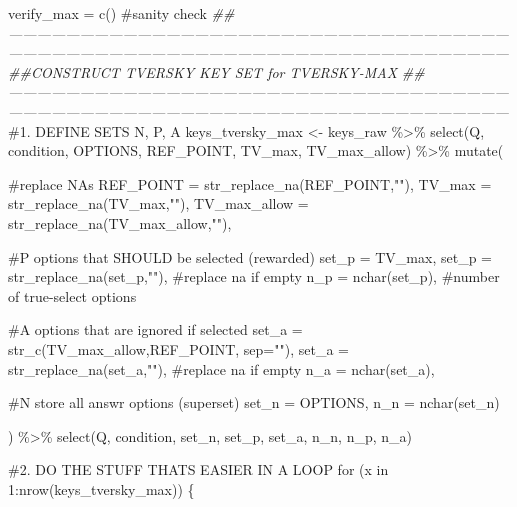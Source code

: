 \documentclass[
  letterpaper,
  DIV=11,
  numbers=noendperiod]{scrreprt}
\newenvironment{Shaded}{\begin{snugshade}}{\end{snugshade}}
\newcommand{\AttributeTok}[1]{\textcolor[rgb]{0.40,0.45,0.13}{#1}}
\newcommand{\CommentTok}[1]{\textcolor[rgb]{0.37,0.37,0.37}{#1}}
\newcommand{\ControlFlowTok}[1]{\textcolor[rgb]{0.00,0.23,0.31}{#1}}
\newcommand{\DecValTok}[1]{\textcolor[rgb]{0.68,0.00,0.00}{#1}}
\newcommand{\DocumentationTok}[1]{\textcolor[rgb]{0.37,0.37,0.37}{\textit{#1}}}
\newcommand{\FunctionTok}[1]{\textcolor[rgb]{0.28,0.35,0.67}{#1}}
\newcommand{\NormalTok}[1]{\textcolor[rgb]{0.00,0.23,0.31}{#1}}
\newcommand{\OtherTok}[1]{\textcolor[rgb]{0.00,0.23,0.31}{#1}}
\newcommand{\SpecialCharTok}[1]{\textcolor[rgb]{0.37,0.37,0.37}{#1}}
\newcommand{\StringTok}[1]{\textcolor[rgb]{0.13,0.47,0.30}{#1}}
\begin{document}
\begin{Shaded}
\begin{Highlighting}[]
\NormalTok{verify\_max }\OtherTok{=} \FunctionTok{c}\NormalTok{() }\CommentTok{\#sanity check}
\DocumentationTok{\#\#——————————————————————————————————————————————————————————————————————}
\DocumentationTok{\#\#CONSTRUCT TVERSKY KEY SET for TVERSKY{-}MAX}
\DocumentationTok{\#\#——————————————————————————————————————————————————————————————————————}
\CommentTok{\#1. DEFINE SETS N, P, A}
\NormalTok{keys\_tversky\_max }\OtherTok{\textless{}{-}}\NormalTok{ keys\_raw }\SpecialCharTok{\%\textgreater{}\%} 
  \FunctionTok{select}\NormalTok{(Q, condition, OPTIONS, REF\_POINT, TV\_max, TV\_max\_allow) }\SpecialCharTok{\%\textgreater{}\%} 
  \FunctionTok{mutate}\NormalTok{(}
  
    \CommentTok{\#replace NAs }
    \AttributeTok{REF\_POINT =} \FunctionTok{str\_replace\_na}\NormalTok{(REF\_POINT,}\StringTok{""}\NormalTok{),}
    \AttributeTok{TV\_max =} \FunctionTok{str\_replace\_na}\NormalTok{(TV\_max,}\StringTok{""}\NormalTok{),}
    \AttributeTok{TV\_max\_allow =} \FunctionTok{str\_replace\_na}\NormalTok{(TV\_max\_allow,}\StringTok{""}\NormalTok{),}
    
    \CommentTok{\#P options that SHOULD be selected (rewarded)}
    \AttributeTok{set\_p =}\NormalTok{ TV\_max,}
    \AttributeTok{set\_p =} \FunctionTok{str\_replace\_na}\NormalTok{(set\_p,}\StringTok{""}\NormalTok{), }\CommentTok{\#replace na if empty}
    \AttributeTok{n\_p =} \FunctionTok{nchar}\NormalTok{(set\_p), }\CommentTok{\#number of true{-}select options}
    
    \CommentTok{\#A options that are ignored if selected }
    \AttributeTok{set\_a =} \FunctionTok{str\_c}\NormalTok{(TV\_max\_allow,REF\_POINT, }\AttributeTok{sep=}\StringTok{""}\NormalTok{),}
    \AttributeTok{set\_a =} \FunctionTok{str\_replace\_na}\NormalTok{(set\_a,}\StringTok{""}\NormalTok{), }\CommentTok{\#replace na if empty}
    \AttributeTok{n\_a =} \FunctionTok{nchar}\NormalTok{(set\_a),}
    
    \CommentTok{\#N store all answr options (superset)}
    \AttributeTok{set\_n =}\NormalTok{ OPTIONS,  }
    \AttributeTok{n\_n =} \FunctionTok{nchar}\NormalTok{(set\_n)}
  
\NormalTok{) }\SpecialCharTok{\%\textgreater{}\%} \FunctionTok{select}\NormalTok{(Q, condition, set\_n, set\_p, set\_a, n\_n, n\_p, n\_a)}

\CommentTok{\#2. DO THE STUFF THAT\textquotesingle{}S EASIER IN A LOOP}
\ControlFlowTok{for}\NormalTok{ (x }\ControlFlowTok{in} \DecValTok{1}\SpecialCharTok{:}\FunctionTok{nrow}\NormalTok{(keys\_tversky\_max)) \{}
  

\end{Highlighting}
\end{Shaded}
\end{document}
